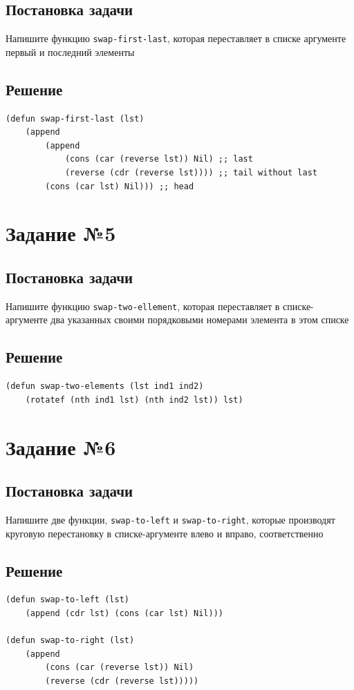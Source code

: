 \documentclass[12pt]{report}
\begin{document}
\subsection*{Постановка задачи}
Напишите функцию \texttt{swap-first-last}, которая переставляет в списке аргументе первый и последний элементы

\subsection*{Решение}
\begin{lstlisting}
(defun swap-first-last (lst)
	(append
		(append
			(cons (car (reverse lst)) Nil) ;; last
			(reverse (cdr (reverse lst)))) ;; tail without last
		(cons (car lst) Nil))) ;; head
\end{lstlisting}

\section*{Задание №5}
\subsection*{Постановка задачи}
Напишите функцию \texttt{swap-two-ellement}, которая переставляет в списке-аргументе два указанных своими порядковыми номерами элемента в этом списке

\subsection*{Решение}
\begin{lstlisting}
(defun swap-two-elements (lst ind1 ind2)
	(rotatef (nth ind1 lst) (nth ind2 lst)) lst)
\end{lstlisting}

\section*{Задание №6}
\subsection*{Постановка задачи}
Напишите две функции, \texttt{swap-to-left} и \texttt{swap-to-right}, которые производят круговую перестановку в списке-аргументе влево и вправо, соответственно

\subsection*{Решение}
\begin{lstlisting}
(defun swap-to-left (lst)
	(append (cdr lst) (cons (car lst) Nil)))

(defun swap-to-right (lst)
	(append
		(cons (car (reverse lst)) Nil)
		(reverse (cdr (reverse lst)))))
\end{lstlisting}
\end{document}
